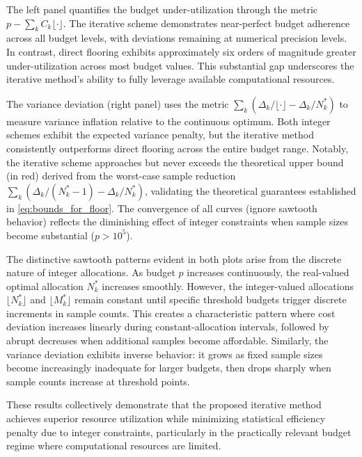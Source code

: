 The left panel quantifies the budget under-utilization through the metric $p - \sum_k C_k \lfloor \cdot \rfloor$. The iterative scheme demonstrates near-perfect budget adherence across all budget levels, with deviations remaining at numerical precision levels. In contrast, direct flooring exhibits approximately six orders of magnitude greater under-utilization across most budget values. This substantial gap underscores the iterative method's ability to fully leverage available computational resources.



The variance deviation (right panel) uses the metric $\sum_k (\Delta_k/\lfloor \cdot \rfloor - \Delta_k/N_k^*)$ to measure variance inflation relative to the continuous optimum. Both integer schemes exhibit the expected variance penalty, but the iterative method consistently outperforms direct flooring across the entire budget range. Notably, the iterative scheme approaches but never exceeds the theoretical upper bound (in red) derived from the worst-case sample reduction $\sum_k (\Delta_k/(N_k^*-1) - \Delta_k/N_k^*)$, validating the theoretical guarantees established in \eqref{eq:bounds_for_floor}. The convergence of all curves (ignore sawtooth behavior) reflects the diminishing effect of integer constraints when sample sizes become substantial ($p > 10^5$).


The distinctive sawtooth patterns evident in both plots arise from the discrete nature of integer allocations. As budget $p$ increases continuously, the real-valued optimal allocation $N_k^*$ increases smoothly. However, the integer-valued allocations $\lfloor N_k^* \rfloor$ and $\lfloor M_k^* \rfloor$ remain constant until specific threshold budgets trigger discrete increments in sample counts. This creates a characteristic pattern where cost deviation increases linearly during constant-allocation intervals, followed by abrupt decreases when additional samples become affordable. Similarly, the variance deviation exhibits inverse behavior: it grows as fixed sample sizes become increasingly inadequate for larger budgets, then drops sharply when sample counts increase at threshold points.


These results collectively demonstrate that the proposed iterative method achieves superior resource utilization while minimizing statistical efficiency penalty due to integer constraints, particularly in the practically relevant budget regime where computational resources are limited.



